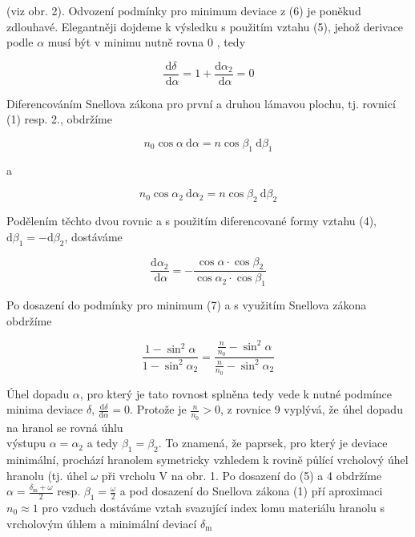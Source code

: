 \documentclass[czech,11pt,a4paper]{article}
\begin{document}
\begin{multicols}{2}
(viz obr. 2). Odvození podmínky pro minimum deviace z (6) je poněkud zdlouhavé. Elegantněji dojdeme k výsledku s použitím vztahu (5), jehož derivace podle $\alpha$ musí být v minimu nutně rovna 0 , tedy

\begin{equation}
	\frac{\mathrm{d} \delta}{\mathrm{~d} \alpha}=1+\frac{\mathrm{d} \alpha_{2}}{\mathrm{~d} \alpha}=0
\end{equation}


Diferencováním Snellova zákona pro první a druhou lámavou plochu, tj. rovnicí (1) resp. 2., obdržíme

\begin{equation}
	n_{0} \cos \alpha \mathrm{~d} \alpha=n \cos \beta_{1} \mathrm{~d} \beta_{1}
\end{equation}


a

\begin{equation}
	n_{0} \cos \alpha_{2} \mathrm{~d} \alpha_{2}=n \cos \beta_{2} \mathrm{~d} \beta_{2}
\end{equation}


Podělením těchto dvou rovnic a s použitím diferencované formy vztahu (4), $\mathrm{d} \beta_{1}=-\mathrm{d} \beta_{2}$, dostáváme

\begin{equation}
	\frac{\mathrm{d} \alpha_{2}}{\mathrm{~d} \alpha}=-\frac{\cos \alpha \cdot \cos \beta_{2}}{\cos \alpha_{2} \cdot \cos \beta_{1}}
\end{equation}

Po dosazení do podmínky pro minimum (7) a s využitím Snellova zákona obdržíme


\begin{equation}
	\frac{1-\sin ^{2} \alpha}{1-\sin ^{2} \alpha_{2}}=\frac{\frac{n}{n_{0}}-\sin ^{2} \alpha}{\frac{n}{n_{0}}-\sin ^{2} \alpha_{2}}
\end{equation}


Úhel dopadu $\alpha$, pro který je tato rovnost splněna tedy vede k nutné podmínce minima deviace $\delta$, $\frac{\mathrm{d} \delta}{\mathrm{d} \alpha}=0$. Protože je $\frac{n}{n_{0}}>0$, z rovnice 9 vyplývá, že úhel dopadu na hranol se rovná úhlu\\
výstupu $\alpha=\alpha_{2}$ a tedy $\beta_{1}=\beta_{2}$. To znamená, že paprsek, pro který je deviace minimální, prochází hranolem symetricky vzhledem k rovině půlící vrcholový úhel hranolu (tj. úhel $\omega$ při vrcholu V na obr. 1. Po dosazení do (5) a 4 obdržíme $\alpha=\frac{\delta_{\mathrm{m}}+\omega}{2}$ resp. $\beta_{1}=\frac{\omega}{2}$ a pod dosazení do Snellova zákona (1) pří aproximaci $n_{0} \approx 1$ pro vzduch dostáváme vztah svazující index lomu materiálu hranolu s vrcholovým úhlem a minimální deviací $\delta_{\mathrm{m}}$


\end{multicols}
\end{document}
